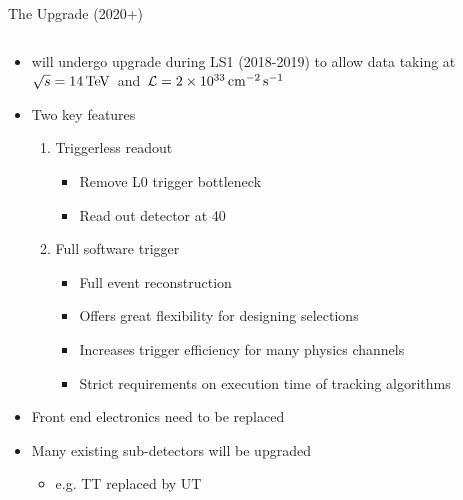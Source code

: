 \documentclass[aspectratio=1610]{beamer}
\begin{document}
\begin{frame}{The \lhcb Upgrade (2020+)}

\begin{columns}
\begin{column}{0.6\textwidth}
  \begin{itemize}
    \item \lhcb  will undergo upgrade during LS1 (2018-2019) to allow data taking at \mbox{$\protect\sqrt{s}=14\mathrm{\,Te\kern -0.1em V}$ and $\mathcal{L}=2\times10^{33}\mathrm{ \,cm}^{-2}\mathrm{{\,s}}^{-1}$}
  \end{itemize}

  \begin{itemize}
    \item Two key features
    \begin{enumerate}
      \item Triggerless readout
      \begin{itemize}
        \item[\ding{70}] Remove L0 trigger bottleneck
        \item[\ding{70}] Read out detector at 40\mhz
      \end{itemize}
      \item Full software trigger
      \begin{itemize}
        \item[\ding{70}] Full event reconstruction
        \item[\ding{70}] Offers great flexibility for designing selections
        \item[\ding{70}] Increases trigger efficiency for many physics channels
        \item[\ding{80}] Strict requirements on execution time of tracking algorithms
      \end{itemize}
    \end{enumerate}
  \end{itemize}

  \begin{itemize}
    \item Front end electronics need to be replaced
    \item Many existing sub-detectors will be upgraded
    \begin{itemize}
        \item[\ding{70}] e.g. TT replaced by UT
      \end{itemize}
  \end{itemize}


\end{column}
\end{columns}
\end{frame}
\end{document}
